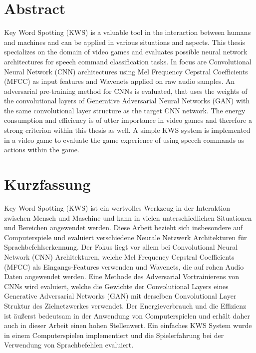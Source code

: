 
\chapter*{Abstract}\label{sec:shards_abstract}
\thesisStateReady
Key Word Spotting (KWS) is a valuable tool in the interaction between humans and machines and can be applied in various situations and aspects.
This thesis specializes on the domain of video games and evaluates possible neural network architectures for speech command classification tasks.
In focus are Convolutional Neural Network (CNN) architectures using Mel Frequency Cepstral Coefficients (MFCC) as input features and Wavenets applied on raw audio samples.
An adversarial pre-training method for CNNs is evaluated, that uses the weights of the convolutional layers of Generative Adversarial Neural Networks (GAN) with the same convolutional layer structure as the target CNN network.
The energy consumption and efficiency is of utter importance in video games and therefore a strong criterion within this thesis as well.
A simple KWS system is implemented in a video game to evaluate the game experience of using speech commands as actions within the game.



\chapter*{Kurzfassung}
\thesisStateReady
Key Word Spotting (KWS) ist ein wertvolles Werkzeug in der Interaktion zwischen Mensch und Maschine und kann in vielen unterschiedlichen Situationen und Bereichen angewendet werden.
Diese Arbeit bezieht sich insbesondere auf Computerspiele und evaluiert verschiedene Neurale Netzwerk Architekturen für Sprachbefehlserkennung.
Der Fokus liegt vor allem bei Convolutional Neural Network (CNN) Architekturen, welche Mel Frequency Cepstral Coefficients (MFCC) als Eingangs-Features verwenden und Wavenets, die auf rohen Audio Daten angewendet werden.
Eine Methode des Adversarial Vortrainierens von CNNs wird evaluiert, welche die Gewichte der Convolutional Layers eines Generative Adversarial Networks (GAN) mit derselben Convolutional Layer Struktur des Zielnetzwerkes verwendet.
Der Energieverbrauch und die Effizienz ist äußerst bedeutsam in der Anwendung von Computerspielen und erhält daher auch in dieser Arbeit einen hohen Stellenwert.
Ein einfaches KWS System wurde in einem Computerspielen implementiert und die Spielerfahrung bei der Verwendung von Sprachbefehlen evaluiert.